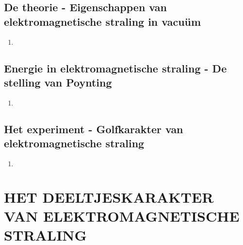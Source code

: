 \documentclass[a4paper,12pt]{article}
\begin{document}
    \subsection{De theorie - Eigenschappen van elektromagnetische straling in vacuüm}
    \begin{enumerate}
        \item 
    \end{enumerate}
    \subsection{Energie in elektromagnetische straling - De stelling van Poynting}
    \begin{enumerate}
        \item 
    \end{enumerate}
    \subsection{Het experiment - Golfkarakter van elektromagnetische straling}
    \begin{enumerate}
        \item 
    \end{enumerate}
    

    \section{HET DEELTJESKARAKTER VAN ELEKTROMAGNETISCHE STRALING}
\end{document}
